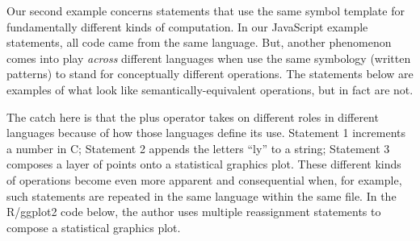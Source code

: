 Our second example concerns statements that use the same symbol template for fundamentally different kinds of computation. In our JavaScript example statements, all code came from the same language. But, another phenomenon comes
into play \emph{across} different languages when use the same symbology (written patterns) to stand for
conceptually different operations. The statements below are examples of what look
like semantically-equivalent operations, but in fact are not.

\begin{Shaded}
\begin{Highlighting}[]
\end{Highlighting}
\end{Shaded}

\begin{Shaded}
\begin{Highlighting}[]
\OperatorTok{=} \OperatorTok{+} 
\end{Highlighting}
\end{Shaded}

\begin{Shaded}
\begin{Highlighting}[]
\StringTok{ }\StringTok{ }\NormalTok{()}
\end{Highlighting}
\end{Shaded}


The catch here is that the plus operator takes on different roles in
different languages because of how those languages define its use.
Statement 1 increments a number in C; Statement 2 appends the letters
``ly'' to a string; Statement 3 composes a layer of points onto a statistical
graphics plot. These different kinds of operations become even more
apparent and consequential when, for example, such statements are
repeated in the same language within the same file. In the R/ggplot2 code below, the author uses multiple
reassignment statements to compose a statistical graphics plot.

